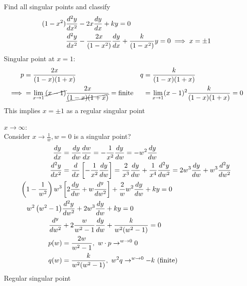 \documentclass[Maths.tex]{subfiles}
\begin{document}
\begin{example}
Find all singular points and classify
\begin{align*}
    (1-x^2)\frac{d^2 y}{dx^2} &- 2x\frac{dy}{dx} + ky = 0 \\
    \frac{d^2 y}{dx^2} &- \frac{2x}{(1-x^2)}\frac{dy}{dx} + \frac{k}{(1-x^2)}y = 0 \implies x = \pm 1
\end{align*}
Singular point at $x = 1$:
\begin{align*}
    p &= \frac{2x}{(1-x)(1+x)} & q &= \frac{k}{(1-x)(1+x)} \\
    \implies &= \lim_{x\to 1} \cancel{(x-1)}\frac{2x}{\cancel{(1-x)(1+x)}} = \text{finite} & &= \lim_{x\to1}(x-1)^2\frac{k}{(1-x)(1+x)} = 0
\end{align*}
This implies $x = \pm 1$ as a regular singular point

$x \to \infty$:\\
Consider $x \to \frac{1}{w}, w = 0$ is a singular point?
\begin{align*}
    \frac{dy}{dx} &= \frac{dy}{dw}\frac{dw}{dx} = -\frac{1}{x^2}\frac{dy}{dw} = -w^2\frac{dy}{dw} \\
    \frac{d^2 y}{dx^2} &= \frac{d}{dx}\left[-\frac{1}{x^2}\frac{dy}{dw}\right] = \frac{2}{x^3}\frac{dy}{dw} + \frac{1}{x^4} \frac{d^2y}{dw^2} = 2w^3\frac{dy}{dw} + w^3\frac{d^2y}{dw^2} \\
    \left(1 - \frac{1}{w^2}\right)w^3&\left[2\frac{dy}{dw} + w\frac{d^y}{dw^2}\right] + \frac{2}{w}w^2\frac{dy}{dw} + ky = 0 \\
    w^2\left(w^2-1\right)&\frac{d^2y}{dw^2} + 2w^3\frac{dy}{dw} + ky = 0 \\
    \frac{d^y}{dw^2} &+ 2\frac{w}{w^2-1}\frac{dy}{dw} + \frac{k}{w^2(w^2-1)} = 0 \\
    p(w) &= \frac{2w}{w^2-1}, ~ w\cdot p \to^{w \to 0} 0 \\
    q(w) &= \frac{k}{w^2(w^2-1)}, ~ w^2q \to^{w \to 0} -k \text{ (finite)}
\end{align*}
Regular singular point
\end{example}
\end{document}
